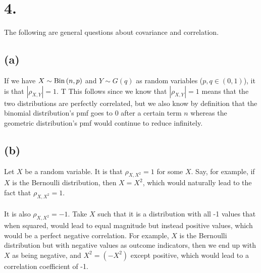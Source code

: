 \documentclass{article}
\begin{document}
\section*{4.}
{\Large 
The following are general questions about covariance and
correlation.

\subsection*{(a)}
If we have $X\sim{\rm Bin}\left(n,p\right)$ and $Y\sim G\left(q\right)$ as random variables ($p,q\in\left(0,1\right)$), it is  that $\left|\rho_{X,Y}\right|=1$. T This follows since we know that $|\rho_{X, Y}| = 1$ means that the two distributions are perfectly correlated, but we also know by definition that the binomial distribution's pmf goes to 0 after a certain term $n$ whereas the geometric distribution's pmf would continue to reduce infinitely.

\subsection*{(b)}
Let $X$ be a random variable. It is  that $\rho_{X,X^{2}}=1$ for some $X$. Say, for example, if $X$ is the Bernoulli distribution, then $X = X^2$, which would naturally lead to the fact that $\rho_{X,X^{2}}=1$. \\ \\
It is also  $\rho_{X,X^{2}}=-1$. Take $X$ such that it is a distribution with all -1 values that when squared, would lead to equal magnitude but instead positive values, which would be a perfect negative correlation. For example, $X$ is the Bernoulli distribution but with negative values as outcome indicators, then we end up with $X$ as being negative, and $X^2 = (-X^2)$ except positive, which would lead to a correlation coefficient of -1.

}
\end{document}
